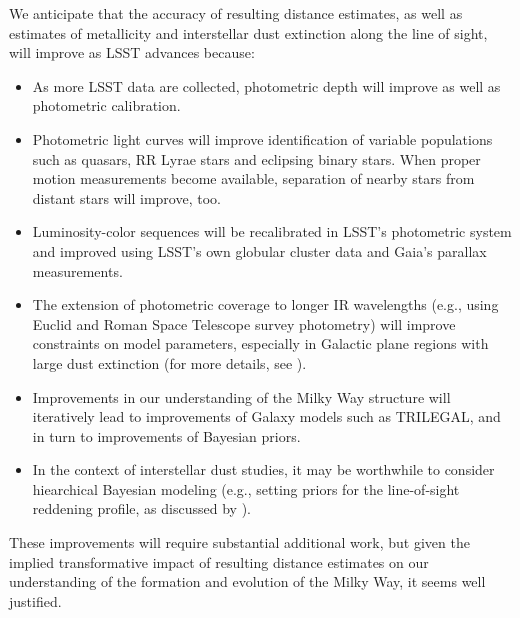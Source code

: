 We anticipate that the accuracy of resulting distance estimates, as well as estimates of metallicity and interstellar dust extinction
along the line of sight, will improve as LSST advances because:
\begin{itemize}
\item As more LSST data are collected, photometric depth will improve as well as photometric calibration. 
\item Photometric light curves will improve identification of variable populations such as quasars, RR Lyrae stars and eclipsing
           binary stars. When proper motion measurements become available, separation of nearby stars from distant stars will improve, too. 
\item Luminosity-color sequences will be recalibrated in LSST's photometric system and improved using LSST's own globular cluster data and Gaia's parallax measurements.
\item The extension of photometric coverage to longer IR wavelengths (e.g., using Euclid and Roman Space Telescope survey photometry)
          will improve constraints on model parameters, especially in Galactic plane regions with large dust extinction (for more details,
          see \citealt{2012ApJ...757..166B}).
\item Improvements in our understanding of the Milky Way structure will iteratively lead to improvements of Galaxy models
         such as TRILEGAL, and in turn to improvements of Bayesian priors.
\item In the context of interstellar dust studies, it may be worthwhile to consider hiearchical Bayesian modeling (e.g., setting priors
             for the line-of-sight reddening profile, as discussed by \citealt{2014ApJ...783..114G}). 
\end{itemize}

These improvements will require substantial additional work, but given the implied transformative impact of resulting
distance estimates on our understanding  of the formation and evolution of the Milky Way, it seems well justified.  